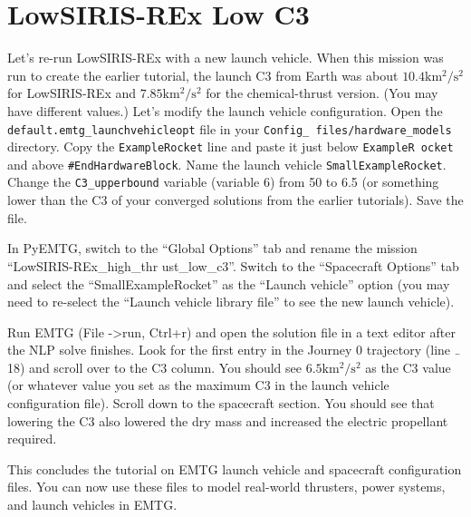 \documentclass[11pt]{article}
\begin{document}
\section{LowSIRIS-REx Low C3}
\label{sec:lowsiris_rex_low_c3}

Let’s re-run LowSIRIS-REx with a new launch vehicle. When this mission was run to create the earlier tutorial, the launch C3 from Earth was about \(10.4 \mathrm{km^2/s^2}\) for LowSIRIS-REx and \(7.85 \mathrm{km^2/s^2}\) for the chemical-thrust version. (You may have different values.) Let’s modify the launch vehicle configuration. Open the \texttt{default.emtg\_launchvehicleopt} file in your \texttt{Config\_ files/hardware\_models} directory. Copy the \texttt{ExampleRocket} line and paste it just below \texttt{ExampleR ocket} and above \texttt{\#EndHardwareBlock}. Name the launch vehicle \texttt{SmallExampleRocket}. Change the \texttt{C3\_upperbound} variable (variable 6) from 50 to 6.5 (or something lower than the C3 of your converged solutions from the earlier tutorials). Save the file.

\noindent In PyEMTG, switch to the ``Global Options'' tab and rename the mission ``LowSIRIS-REx\_high\_thr ust\_low\_c3''. Switch to the ``Spacecraft Options'' tab and select the ``SmallExampleRocket'' as the ``Launch vehicle'' option (you may need to re-select the ``Launch vehicle library file'' to see the new launch vehicle). 

\noindent Run EMTG (File -\textgreater run, Ctrl+r) and open the solution file in a text editor after the \acs{NLP} solve finishes. Look for the first entry in the Journey 0 trajectory (line \({}_{\textrm{\symbol{126}}}\)18) and scroll over to the C3 column. You should see \(6.5 \mathrm{km^2/s^2}\) as the C3 value (or whatever value you set as the maximum C3 in the launch vehicle configuration file). Scroll down to the spacecraft section. You should see that lowering the C3 also lowered the dry mass and increased the electric propellant required.

\noindent This concludes the tutorial on \ac{EMTG} launch vehicle and spacecraft configuration files. You can now use these files to model real-world thrusters, power systems, and launch vehicles in \ac{EMTG}.
\end{document}
